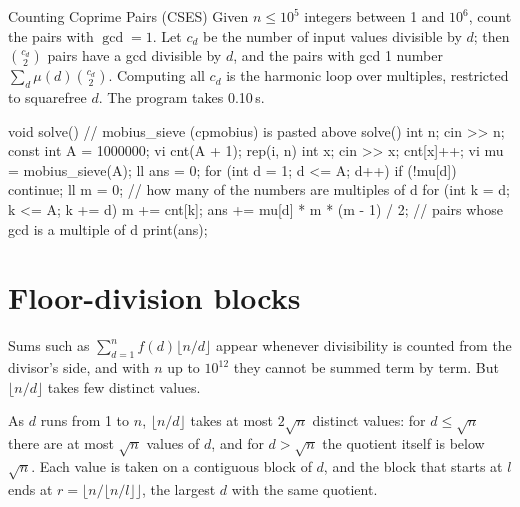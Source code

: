 \begin{problem}{Counting Coprime Pairs (CSES)}
Given $n \le 10^5$ integers between 1 and $10^6$, count the pairs with $\gcd = 1$.
\solution Let $c_d$ be the number of input values divisible by $d$; then $\binom{c_d}{2}$ pairs have a gcd divisible by $d$, and the
pairs with gcd 1 number $\sum_d \mu(d) \binom{c_d}{2}$. Computing all $c_d$ is the harmonic loop over multiples, restricted to
squarefree $d$. The program takes 0.10\,s.
\end{problem}

\begin{code}
void solve() {  // mobius_sieve (cpmobius) is pasted above solve()
    int n;
    cin >> n;
    const int A = 1000000;
    vi cnt(A + 1);
    rep(i, n) {
        int x;
        cin >> x;
        cnt[x]++;
    }
    vi mu = mobius_sieve(A);
    ll ans = 0;
    for (int d = 1; d <= A; d++) {
        if (!mu[d]) continue;
        ll m = 0;  // how many of the numbers are multiples of d
        for (int k = d; k <= A; k += d) m += cnt[k];
        ans += mu[d] * m * (m - 1) / 2;  // pairs whose gcd is a multiple of d
    }
    print(ans);
}
\end{code}

\section[Floor-division blocks]{Floor-division blocks \hfill \plat}\label{sec:floorblocks}

Sums such as $\sum_{d=1}^{n} f(d) \lfloor n/d \rfloor$ appear whenever divisibility is counted from the divisor's side, and with $n$
up to $10^{12}$ they cannot be summed term by term. But $\lfloor n/d \rfloor$ takes few distinct values.

\begin{fact}
As $d$ runs from 1 to $n$, $\lfloor n/d \rfloor$ takes at most $2\sqrt n$ distinct values: for $d \le \sqrt n$ there are at most
$\sqrt n$ values of $d$, and for $d > \sqrt n$ the quotient itself is below $\sqrt n$. Each value is taken on a contiguous block of
$d$, and the block that starts at $l$ ends at $r = \lfloor n / \lfloor n/l \rfloor \rfloor$, the largest $d$ with the same quotient.
\end{fact}


